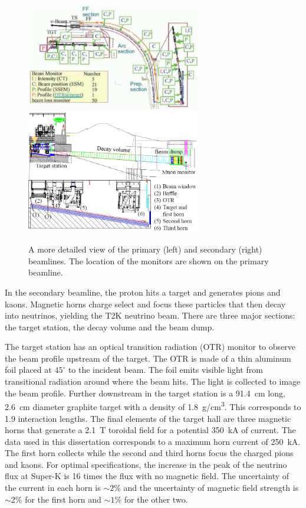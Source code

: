 \begin{figure}
\begin{center}
\includegraphics[width=3in]{./Figures/beam2.png}
\includegraphics[width=3in]{./Figures/beam3.png}
\end{center}
\caption{A more detailed view of the primary (left) and secondary (right) beamlines. The location of the monitors are shown on the   primary beamline.}
\label{fig:beam2}
\end{figure}
In the secondary beamline, the proton hits a target and generates
pions and kaons. Magnetic horns charge select and focus these
particles that then decay into
neutrinos, yielding the T2K neutrino beam. There are three major
sections: the target station, the decay volume and the beam dump.

The target station has an optical transition radiation (OTR) monitor
to observe the beam profile upstream of the target. The OTR is made of
a thin aluminum foil placed at $45^{\circ}$ to the incident beam. The
foil emits visible light from transitional radiation around where the
beam hits. The light is collected to image the beam profile. Further
downstream in the target station is a 91.4~cm long, 2.6~cm diameter
graphite target with a density of 1.8~g/cm\textsuperscript{3}. This
corresponds to 1.9 interaction lengths. The final elements of the
target hall are three magnetic horns  that generate a 2.1~T toroidal
field for a potential 350~kA of current. The data used in this
dissertation corresponds to a maximum horn current of 250~kA. The
first horn collects while the second and third
horns focus the charged pions and kaons. For optimal
specifications, the increase in the peak of the neutrino flux at Super-K is 16 times
the flux with no magnetic field. The uncertainty of the current in
each horn is $\sim 2\%$ and the uncertainty of magnetic
field strength is $\sim 2\%$ for the first horn and
$\sim 1\%$ for the other two.

